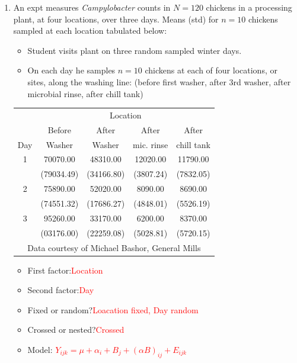 \begin{enumerate}
\item An expt measures {\em Campylobacter} counts in $N=120$ chickens in a processing plant, at four locations, over three days.  Means (std) for $n=10$ chickens sampled at each location tabulated below:
\begin{itemize}
\item Student visits plant on three random sampled winter days.
\item On each day he samples $n=10$ chickens at each of four locations, or sites, along the washing line: (before first washer, after 3rd washer, after microbial rinse, after chill tank)
\end{itemize}
\begin{center}
\begin{large}
\begin{tabular}{c|cccc}
& \multicolumn{4}{c}{Location} \\
& Before & After & After & After \\
Day & Washer & Washer & mic. rinse & chill tank \\ \hline
 1       &       70070.00      &      48310.00      &      12020.00      &      11790.00 \\
         &      (79034.49)     &     (34166.80)     &      (3807.24)     &      (7832.05)\\
 2       &       75890.00      &      52020.00      &       8090.00      &       8690.00 \\
         &      (74551.32)     &     (17686.27)     &      (4848.01)     &      (5526.19) \\
 3       &       95260.00      &      33170.00      &       6200.00      &       8370.00 \\
         &      (03176.00)     &     (22259.08)     &      (5028.81)     &      (5720.15) \\ \hline
\multicolumn{5}{c}{Data courtesy of Michael Bashor, General Mills } \\
\end{tabular}
\end{large}
\end{center}

\begin{itemize}
\item First factor:\textcolor{red}{Location}
\item Second factor:\textcolor{red}{Day}
\item Fixed or random?\textcolor{red}{Loacation fixed, Day random}
\item Crossed or nested?\textcolor{red}{Crossed}
\item Model:  
\textcolor{red}{$Y_{ijk} = \mu + \alpha_i+B_j+(\alpha B)_{ij} + E_{ijk}$}
\end{itemize}


\end{enumerate}

